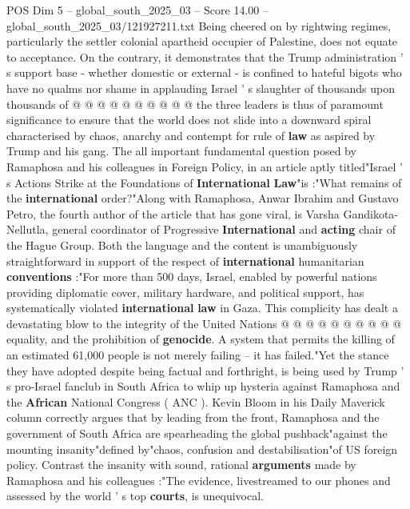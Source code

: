 \begin{textsample}{POS Dim 5 – global\_south\_2025\_03 – Score 14.00 – global\_south\_2025\_03/121927211.txt}
Being cheered on by rightwing regimes, particularly the settler colonial apartheid occupier of Palestine, does not equate to acceptance.
On the contrary, it demonstrates that the Trump administration ' s support base - whether domestic or external - is confined to hateful bigots who have no qualms nor shame in applauding Israel ' s slaughter of thousands upon thousands of @ @ @ @ @ @ @ @ @ @ the three leaders is thus of paramount significance to ensure that the world does not slide into a downward spiral characterised by chaos, anarchy and contempt for rule of \textbf{law} as aspired by Trump and his gang.
The all important fundamental question posed by Ramaphosa and his colleagues in Foreign Policy, in an article aptly titled"Israel ' s Actions Strike at the Foundations of \textbf{International} \textbf{Law}"is :"What remains of the \textbf{international} order?"Along with Ramaphosa, Anwar Ibrahim and Gustavo Petro, the fourth author of the article that has gone viral, is Varsha Gandikota-Nellutla, general coordinator of Progressive \textbf{International} and \textbf{acting} chair of the Hague Group.
Both the language and the content is unambiguously straightforward in support of the respect of \textbf{international} humanitarian \textbf{conventions} :"For more than 500 days, Israel, enabled by powerful nations providing diplomatic cover, military hardware, and political support, has systematically violated \textbf{international} \textbf{law} in Gaza.
This complicity has dealt a devastating blow to the integrity of the United Nations @ @ @ @ @ @ @ @ @ @ equality, and the prohibition of \textbf{genocide}.
A system that permits the killing of an estimated 61,000 people is not merely failing -- it has failed."Yet the stance they have adopted despite being factual and forthright, is being used by Trump ' s pro-Israel fanclub in South Africa to whip up hysteria against Ramaphosa and the \textbf{African} National Congress ( ANC ).
Kevin Bloom in his Daily Maverick column correctly argues that by leading from the front, Ramaphosa and the government of South Africa are spearheading the global pushback"against the mounting insanity"defined by"chaos, confusion and destabilisation"of US foreign policy.
Contrast the insanity with sound, rational \textbf{arguments} made by Ramaphosa and his colleagues :"The evidence, livestreamed to our phones and assessed by the world ' s top \textbf{courts}, is unequivocal.

\end{textsample}
